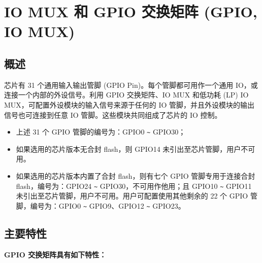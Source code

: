 \documentclass[main\_\_CN.tex]{subfiles}
\begin{document}

\ifglobal
\else
    {\let\clearpage\relax \listoftodos}
    {\let\clearpage\relax \listofdonetodos}
    \tableofcontents
    \listoftables
    \listoffigures
\fi



\hypertarget{iomuxgpio}{}
\chapter{IO MUX 和 GPIO 交换矩阵 (GPIO, IO MUX)}
\label{mod:iomuxgpio}

\section{概述}

\chipname{} 芯片有 31 个通用输入输出管脚 (GPIO Pin)。每个管脚都可用作一个通用 IO，或连接一个内部的外设信号。利用 GPIO 交换矩阵、IO MUX 和低功耗 (LP) IO MUX，可配置外设模块的输入信号来源于任何的 IO 管脚，并且外设模块的输出信号也可连接到任意 IO 管脚。这些模块共同组成了芯片的 IO 控制。

\begin{tiplisting}
\vspace{-2em}
\begin{itemize}
\item 上述 31 个 GPIO 管脚的编号为：GPIO0 \verb+~+ GPIO30；
\item 如果选用的芯片版本无合封 flash，则 GPIO14 未引出至芯片管脚，用户不可用。
\item 如果选用的芯片版本内置了合封 flash，则有七个 GPIO 管脚专用于连接合封 flash，编号为：GPIO24 \verb+~+ GPIO30，不可用作他用；且 GPIO10 \verb+~+ GPIO11 未引出至芯片管脚，用户不可用。用户可配置使用其他剩余的 22 个 GPIO 管脚，编号为：GPIO0 \verb+~+ GPIO9、GPIO12 \verb+~+ GPIO23。
\end{itemize}
\end{tiplisting}

\section{主要特性}

\textbf{GPIO 交换矩阵具有如下特性：}
\end{document}
